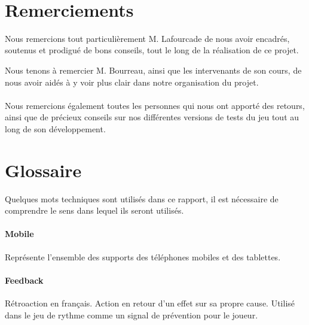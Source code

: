 \documentclass [a4 paper,11pt]{report}
\begin{document}
\newcommand{\HRule}{\rule{\linewidth}{0.5mm}}

\pagestyle{fancy}
\renewcommand\headrulewidth{1pt}
\fancyhead[L]{}
\fancyhead[R]{\leftmark}



\newpage 
~
\thispagestyle{empty}

\newpage

\thispagestyle{empty}
\section*{Remerciements}

Nous remercions tout particulièrement M. Lafourcade de nous avoir encadrés, soutenus et prodigué de bons conseils, tout le long de la réalisation de ce projet.

Nous tenons à remercier M. Bourreau, ainsi que les intervenants de son cours, de nous avoir aidés à y voir plus clair dans notre organisation du projet.

\paragraph{}
Nous remercions également toutes les personnes qui nous ont apporté des retours, ainsi que de précieux conseils sur nos différentes versions de tests du jeu tout au long de son développement.


\newpage

\setcounter{page}{1}
\tableofcontents

\newpage

\listoffigures

\newpage 



\newpage

\section*{Glossaire}

Quelques mots techniques sont utilisés dans ce rapport, il est nécessaire de comprendre le sens dans lequel ils seront utilisés.

\paragraph{Mobile} Représente l'ensemble des supports des téléphones mobiles et des tablettes.

\paragraph{Feedback} Rétroaction en français. Action en retour d’un effet sur sa propre cause. Utilisé dans le jeu de rythme comme un signal de prévention pour le joueur.
\end{document}
